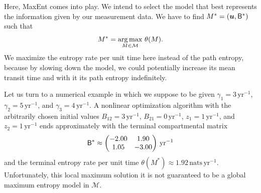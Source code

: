 \documentclass[smallextended]{svjour3}
\newcommand{\yr}{\mathrm{yr}}
\newcommand{\nats}{\mathrm{nats}}
\begin{document}
	Here, MaxEnt comes into play.
	We intend to select the model that best represents the information given by our measurement data.
	We have to find $M^\ast=(\vec{u},\tens{B}^\ast)$ such that
	\begin{equation*}
		M^\ast = \operatornamewithlimits{arg\,max}\limits_{M\in\mathcal{M}}\,\theta(M).
	\end{equation*}
	We maximize the entropy rate per unit time here instead of the path entropy, because by slowing down the model, we could potentially increase its mean transit time and with it its path entropy indefinitely.
	
	Let us turn to a numerical example in which we suppose to be given $\gamma_1=3\,\yr^{-1}$, $\gamma_2=5\,\yr^{-1}$, and $\gamma_3=4\,\yr^{-1}$.
	A nonlinear optimization algorithm with the arbitrarily chosen initial values $B_{12}=3\,\yr^{-1}$, $B_{21}=0\,\yr^{-1}$, $z_1=1\,\yr^{-1}$, and $z_2=1\,\yr^{-1}$ ends approximately with the terminal compartmental matrix
	\begin{equation*}
		\tens{B}^\ast \approx \begin{pmatrix} -2.00 & 1.90 \\ 1.05 & -3.00 \end{pmatrix}\,\yr^{-1}
	\end{equation*}
	and the terminal entropy rate per unit time $\theta(M^\ast) \approx 1.92\,\nats\,\yr^{-1}$.
	Unfortunately, this local maximum solution it is not guaranteed to be a global maximum entropy model in $\mathcal{M}$.
	
\end{document}
